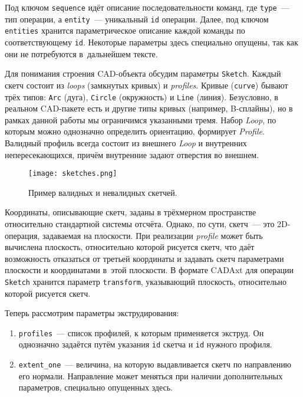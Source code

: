 \newpage

Под ключом \texttt{sequence} идёт описание последовательности команд,
где \texttt{type}~--- тип операции, а \texttt{entity}~--- уникальный \texttt{id} операции.
Далее, под ключом \texttt{entities} хранится параметрическое описание каждой команды по соответствующему \texttt{id}.
Некоторые параметры здесь специально опущены, так как они не потребуются в~дальнейшем тексте.

Для понимания строения CAD-объекта обсудим параметры \texttt{Sketch}.
Каждый скетч состоит из \textit{loops} (замкнутых кривых) и \textit{profiles}.
Кривые (\texttt{curve}) бывают трёх типов: \texttt{Arc} (дуга), \texttt{Circle} (окружность) и \texttt{Line} (линия).
Безусловно, в реальном CAD-пакете есть и другие типы кривых (например, B-сплайны),
но в рамках данной работы мы ограничимся указанными тремя.
Набор \textit{Loop}, по которым можно однозначно определить ориентацию, формирует \textit{Profile}.
Валидный профиль всегда состоит из внешнего \textit{Loop} и внутренних непересекающихся,
причём внутренние задают отверстия во внешнем.

\begin{figure}[h!]
    \centering
    \texttt{[image: sketches.png]}
    \caption{Пример валидных и невалидных скетчей.}
    \label{fig:sketches}
\end{figure}

Координаты, описывающие скетч, заданы в трёхмерном пространстве относительно стандартной системы отсчёта.
Однако, по сути, скетч~--- это 2D-операция, задаваемая на плоскости.
При реализации \textit{profile} может быть вычислена плоскость, относительно которой рисуется скетч,
что даёт возможность отказаться от третьей координаты и задавать скетч параметрами плоскости и координатами в~этой плоскости.
В формате CADAxt для операции \texttt{Sketch} хранится параметр \texttt{transform}, указывающий плоскость,
относительно которой рисуется скетч.

Теперь рассмотрим параметры экструдирования:
\begin{enumerate}
    \item \texttt{profiles}~--- список профилей, к которым применяется экструд.
          Он однозначно задаётся путём указания \texttt{id} скетча и \texttt{id} нужного профиля.
    \item \texttt{extent\_one}~--- величина, на которую выдавливается скетч по направлению его нормали.
          Направление может меняться при наличии дополнительных параметров, специально опущенных здесь.
\end{enumerate}

